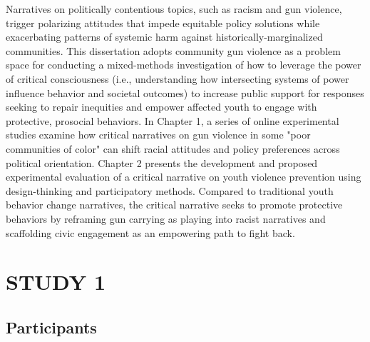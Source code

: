 \documentclass[
]{book}
\begin{document}
Narratives on politically contentious topics, such as racism and gun violence, trigger polarizing attitudes that impede equitable policy solutions while exacerbating patterns of systemic harm against historically-marginalized communities. This dissertation adopts community gun violence as a problem space for conducting a mixed-methods investigation of how to leverage the power of critical consciousness (i.e., understanding how intersecting systems of power influence behavior and societal outcomes) to increase public support for responses seeking to repair inequities and empower affected youth to engage with protective, prosocial behaviors. In Chapter 1, a series of online experimental studies examine how critical narratives on gun violence in some "poor communities of color" can shift racial attitudes and policy preferences across political orientation. Chapter 2 presents the development and proposed experimental evaluation of a critical narrative on youth violence prevention using design-thinking and participatory methods. Compared to traditional youth behavior change narratives, the critical narrative seeks to promote protective behaviors by reframing gun carrying as playing into racist narratives and scaffolding civic engagement as an empowering path to fight back.

\hypertarget{study-1}{%
\chapter{STUDY 1}\label{study-1}}

\hypertarget{participants}{%
\section{Participants}\label{participants}}
\end{document}
